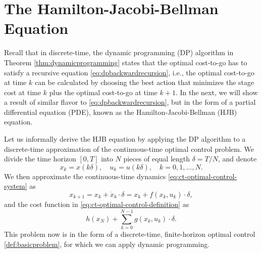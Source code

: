 \documentclass[
]{book}
\theoremstyle{definition}
\theoremstyle{definition}
\theoremstyle{definition}
\theoremstyle{definition}
\theoremstyle{remark}
\begin{document}
\hypertarget{the-hamilton-jacobi-bellman-equation}{%
\section{The Hamilton-Jacobi-Bellman Equation}\label{the-hamilton-jacobi-bellman-equation}}

Recall that in discrete-time, the dynamic programming (DP) algorithm in Theorem \ref{thm:dynamicprogramming} states that the optimal cost-to-go has to satisfy a recursive equation \eqref{eq:dpbackwardrecursion}, i.e., the optimal cost-to-go at time \(k\) can be calculated by choosing the best action that minimizes the stage cost at time \(k\) plus the optimal cost-to-go at time \(k+1\). In the next, we will show a result of similar flavor to \eqref{eq:dpbackwardrecursion}, but in the form of a partial differential equation (PDE), known as the Hamilton-Jacobi-Bellman (HJB) equation.

Let us informally derive the HJB equation by applying the DP algorithm to a discrete-time approximation of the continuous-time optimal control problem. We divide the time horizon \([0,T]\) into \(N\) pieces of equal length \(\delta = T/N\), and denote
\[
x_k = x(k\delta), \quad u_k = u(k \delta), \quad k = 0,1,\dots,N.
\]
We then approximate the continuous-time dynamics \eqref{eq:ct-optimal-control-system} as
\[
x_{k+1} = x_k + \dot{x}_k \cdot \delta = x_k + f(x_k,u_k) \cdot \delta,
\]
and the cost function in \eqref{eq:ct-optimal-control-definition} as
\[
h(x_N) + \sum_{k=0}^{N-1} g(x_k, u_k)\cdot \delta.
\]
This problem now is in the form of a discrete-time, finite-horizon optimal control \ref{def:basicproblem}, for which we can apply dynamic programming.
\end{document}
